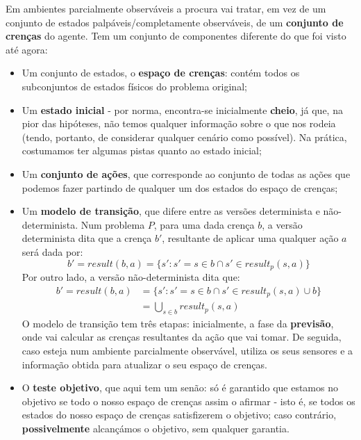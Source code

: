 \documentclass[11pt]{article}
\begin{document}
Em ambientes parcialmente observáveis a procura vai tratar, em vez de um conjunto de estados palpáveis/completamente observáveis, de um \textbf{conjunto de crenças} do agente. Tem um conjunto de componentes diferente do que foi visto até agora:
\begin{itemize}
    \item Um conjunto de estados, o \textbf{espaço de crenças}: contém todos os subconjuntos de estados físicos do problema original;
    \item Um \textbf{estado inicial} - por norma, encontra-se inicialmente \textbf{cheio}, já que, na pior das hipóteses, não temos qualquer informação sobre o que nos rodeia (tendo, portanto, de considerar qualquer cenário como possível). Na prática, costumamos ter algumas pistas quanto ao estado inicial;
    \item Um \textbf{conjunto de ações}, que corresponde ao conjunto de todas as ações que podemos fazer partindo de qualquer um dos estados do espaço de crenças;
    \item Um \textbf{modelo de transição}, que difere entre as versões determinista e não-determinista. Num problema $P$, para uma dada crença $b$, a versão determinista dita que a crença $b'$, resultante de aplicar uma qualquer ação $a$ será dada por:
    \begin{equation*}
        b'=result(b,a)=\{s':s'=s\in b\cap s'\in result_p(s,a)\}
    \end{equation*}
    Por outro lado, a versão não-determinista dita que:
    \begin{equation*}
    \begin{split}
        b' = result(b,a) & = \{s':s'=s\in b\cap s'\in result_p(s,a)\cup b\} \\
                         & = \bigcup_{s\in b} result_p(s,a)
    \end{split}
    \end{equation*}
    O modelo de transição tem três etapas: inicialmente, a fase da \textbf{previsão}, onde vai calcular as crenças resultantes da ação que vai tomar. De seguida, caso esteja num ambiente parcialmente observável, utiliza os seus sensores e a informação obtida para atualizar o seu espaço de crenças.
    \item O \textbf{teste objetivo}, que aqui tem um senão: só é garantido que estamos no objetivo se todo o nosso espaço de crenças assim o afirmar - isto é, se todos os estados do nosso espaço de crenças satisfizerem o objetivo; caso contrário, \textbf{possivelmente} alcançámos o objetivo, sem qualquer garantia.
\end{itemize}
\end{document}
